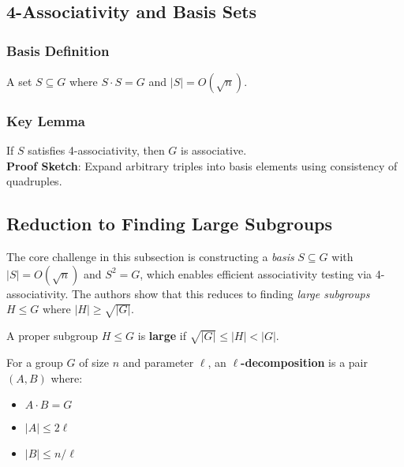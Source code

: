 \documentclass[sigconf]{acmart}
\begin{document}
\subsection{4-Associativity and Basis Sets}
\subsubsection{Basis Definition}
A set \( S \subseteq G \) where \( S \cdot S = G \) and \( |S| = O(\sqrt{n}) \).

\subsubsection{Key Lemma}
If \( S \) satisfies 4-associativity, then \( G \) is associative. \\
\textbf{Proof Sketch}: Expand arbitrary triples into basis elements using consistency of quadruples.

\subsection{Reduction to Finding Large Subgroups}
\label{sec:large-subgroups}

The core challenge in this subsection is constructing a \emph{basis} $S \subseteq G$ with $|S| = O(\sqrt{n})$ and $S^2 = G$, which enables efficient associativity testing via 4-associativity. The authors show that this reduces to finding \emph{large subgroups} $H \leq G$ where $|H| \geq \sqrt{|G|}$.

\begin{definition}
A proper subgroup $H \leq G$ is \textbf{large} if $\sqrt{|G|} \leq |H| < |G|$.
\end{definition}

\begin{definition}
For a group $G$ of size $n$ and parameter $\ell$, an \textbf{$\ell$-decomposition} is a pair $(A,B)$ where:
\begin{itemize}
    \item $A \cdot B = G$
    \item $|A| \leq 2\ell$
    \item $|B| \leq n/\ell$
\end{itemize}
\end{definition}
\end{document}
